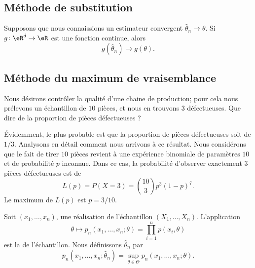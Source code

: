 \subsection{Méthode de substitution}

Supposons que nous connaissions un estimateur convergent \( \hat\theta_n\to\theta\). Si \( g\colon \eR^d\to \eR\) est une fonction continue, alors
\begin{equation}
	g(\hat\theta_n)\to g(\theta).
\end{equation}

\subsection{Méthode du maximum de vraisemblance}

\begin{example}     \label{ExVrasMaxLp}
	Nous désirons contrôler la qualité d'une chaine de production; pour cela nous prélevons un échantillon de \( 10\) pièces, et nous en trouvons \( 3\) défectueuses. Que dire de la proportion de pièces défectueuses ?

	Évidemment, le plus probable est que la proportion de pièces défectueuses soit de \( 1/3\). Analysons en détail comment nous arrivons à ce résultat. Nous considérons que le fait de tirer \( 10\) pièces revient à une expérience binomiale de paramètres \( 10\) et de probabilité \( p\) inconnue. Dans ce cas, la probabilité d'observer exactement \( 3\) pièces défectueuses est de
	\begin{equation}
		L(p)=P(X=3)={10\choose 3}p^3(1-p)^{7}.
	\end{equation}
	Le maximum de \( L(p)\) est \( p=3/10\).

	\newcommand{\CaptionFigMaxVraissLp}{La fonction de vraisemblance de l'exemple~\ref{ExVrasMaxLp}.}
	
\end{example}

Soit \( (x_1,\ldots,x_n)\), une réalisation de l'échantillon \( (X_1,\ldots,X_n)\). L'application
\begin{equation}
	\theta\mapsto p_n(x_1,\ldots,x_n;\theta)=\prod_{i=1}^np(x_i,\theta)
\end{equation}
est la  de l'échantillon. Nous définissons \( \hat\theta_n\) par
\begin{equation}
	p_n(x_1,\dots,x_n;\hat\theta_n)=\sup_{\theta\in\Theta}p_n(x_1,\ldots,x_n;\theta).
\end{equation}

